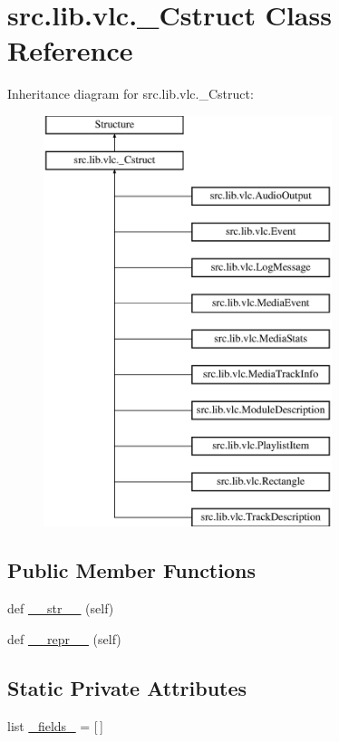 \hypertarget{classsrc_1_1lib_1_1vlc_1_1__Cstruct}{}\section{src.\+lib.\+vlc.\+\_\+\+Cstruct Class Reference}
\label{classsrc_1_1lib_1_1vlc_1_1__Cstruct}
Inheritance diagram for src.\+lib.\+vlc.\+\_\+\+Cstruct\+:\begin{figure}[H]
\begin{center}
\leavevmode
\includegraphics[height=12.000000cm]{classsrc_1_1lib_1_1vlc_1_1__Cstruct}
\end{center}
\end{figure}
\subsection*{Public Member Functions}
\begin{DoxyCompactItemize}
\item 
def \hyperlink{classsrc_1_1lib_1_1vlc_1_1__Cstruct_aa16823982fa22c371ef8b42be32a1196}{\+\_\+\+\_\+str\+\_\+\+\_\+} (self)
\item 
def \hyperlink{classsrc_1_1lib_1_1vlc_1_1__Cstruct_a342ce090e21ebd7ab2a76ab96c5f14a6}{\+\_\+\+\_\+repr\+\_\+\+\_\+} (self)
\end{DoxyCompactItemize}
\subsection*{Static Private Attributes}
\begin{DoxyCompactItemize}
\item 
list \hyperlink{classsrc_1_1lib_1_1vlc_1_1__Cstruct_a6503fe1f19dd39cab7b175dd1cf11e8a}{\+\_\+fields\+\_\+} = \mbox{[}$\,$\mbox{]}
\end{DoxyCompactItemize}



